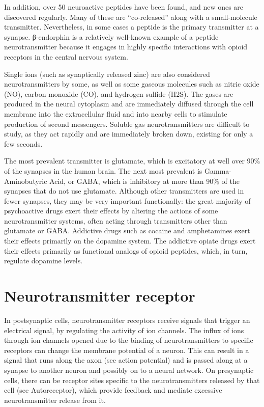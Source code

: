 \documentclass[]{book}
\begin{document}
In addition, over 50 neuroactive peptides have been found, and new ones are discovered regularly. Many of these are ``co-released'' along with a small-molecule transmitter. Nevertheless, in some cases a peptide is the primary transmitter at a synapse. β-endorphin is a relatively well-known example of a peptide neurotransmitter because it engages in highly specific interactions with opioid receptors in the central nervous system.

Single ions (such as synaptically released zinc) are also considered neurotransmitters by some, as well as some gaseous molecules such as nitric oxide (NO), carbon monoxide (CO), and hydrogen sulfide (H2S). The gases are produced in the neural cytoplasm and are immediately diffused through the cell membrane into the extracellular fluid and into nearby cells to stimulate production of second messengers. Soluble gas neurotransmitters are difficult to study, as they act rapidly and are immediately broken down, existing for only a few seconds.

The most prevalent transmitter is glutamate, which is excitatory at well over 90\% of the synapses in the human brain. The next most prevalent is Gamma-Aminobutyric Acid, or GABA, which is inhibitory at more than 90\% of the synapses that do not use glutamate. Although other transmitters are used in fewer synapses, they may be very important functionally: the great majority of psychoactive drugs exert their effects by altering the actions of some neurotransmitter systems, often acting through transmitters other than glutamate or GABA. Addictive drugs such as cocaine and amphetamines exert their effects primarily on the dopamine system. The addictive opiate drugs exert their effects primarily as functional analogs of opioid peptides, which, in turn, regulate dopamine levels.

\hypertarget{neurotransmitter-receptor}{%
\section{Neurotransmitter receptor}\label{neurotransmitter-receptor}}

In postsynaptic cells, neurotransmitter receptors receive signals that trigger an electrical signal, by regulating the activity of ion channels. The influx of ions through ion channels opened due to the binding of neurotransmitters to specific receptors can change the membrane potential of a neuron. This can result in a signal that runs along the axon (see action potential) and is passed along at a synapse to another neuron and possibly on to a neural network. On presynaptic cells, there can be receptor sites specific to the neurotransmitters released by that cell (see Autoreceptor), which provide feedback and mediate excessive neurotransmitter release from it.
\end{document}
